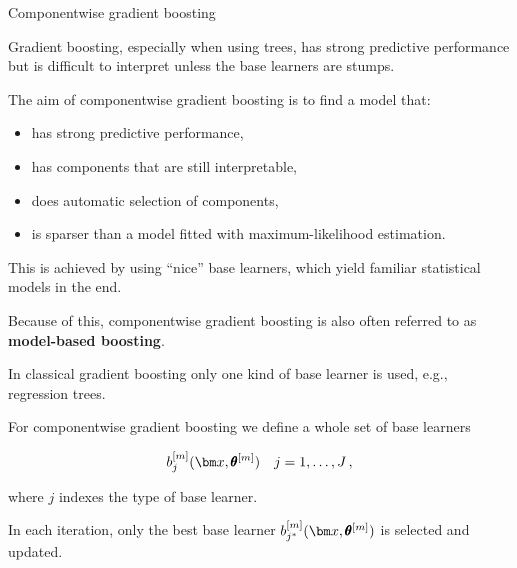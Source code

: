 










\begin{vbframe}{Componentwise gradient boosting}

Gradient boosting, especially when using trees, has strong predictive
performance but is difficult to interpret unless the base learners are stumps.

\lz

The aim of componentwise gradient boosting is to find a model that:

\begin{itemize}
  \item
    has strong predictive performance,

  \item
    has components that are still interpretable,

  \item
    does automatic selection of components,

  \item
    is sparser than a model fitted with maximum-likelihood estimation.
\end{itemize}

\lz

This is achieved by using \enquote{nice} base learners, which yield familiar statistical models
in the end.

\lz

Because of this, componentwise gradient boosting is also often referred to as \textbf{model-based boosting}.

\framebreak

In classical gradient boosting only one kind of base learner is used, e.g., regression trees.

\lz

For componentwise gradient boosting we define a whole set of base learners

$$
  b_j^{[m]}(\xv,\pmb\theta^{[m]}) \quad j = 1,\dots, J\,,
$$

where $j$ indexes the type of base learner.

\lz

In each iteration, only the best base learner $b_{j^\ast}^{[m]}(\xv,\pmb\theta^{[m]})$ is selected and updated.


\end{vbframe}

